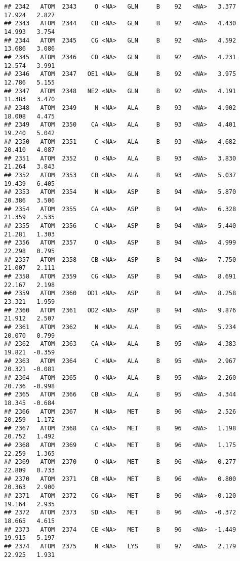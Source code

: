 \documentclass[
]{article}
\begin{document}
\begin{verbatim}
## 2342   ATOM  2343     O <NA>   GLN     B    92   <NA>   3.377  17.924   2.827
## 2343   ATOM  2344    CB <NA>   GLN     B    92   <NA>   4.430  14.993   3.754
## 2344   ATOM  2345    CG <NA>   GLN     B    92   <NA>   4.592  13.686   3.086
## 2345   ATOM  2346    CD <NA>   GLN     B    92   <NA>   4.231  12.574   3.991
## 2346   ATOM  2347   OE1 <NA>   GLN     B    92   <NA>   3.975  12.786   5.155
## 2347   ATOM  2348   NE2 <NA>   GLN     B    92   <NA>   4.191  11.383   3.470
## 2348   ATOM  2349     N <NA>   ALA     B    93   <NA>   4.902  18.008   4.475
## 2349   ATOM  2350    CA <NA>   ALA     B    93   <NA>   4.401  19.240   5.042
## 2350   ATOM  2351     C <NA>   ALA     B    93   <NA>   4.682  20.410   4.087
## 2351   ATOM  2352     O <NA>   ALA     B    93   <NA>   3.830  21.264   3.843
## 2352   ATOM  2353    CB <NA>   ALA     B    93   <NA>   5.037  19.439   6.405
## 2353   ATOM  2354     N <NA>   ASP     B    94   <NA>   5.870  20.386   3.506
## 2354   ATOM  2355    CA <NA>   ASP     B    94   <NA>   6.328  21.359   2.535
## 2355   ATOM  2356     C <NA>   ASP     B    94   <NA>   5.440  21.281   1.303
## 2356   ATOM  2357     O <NA>   ASP     B    94   <NA>   4.999  22.298   0.795
## 2357   ATOM  2358    CB <NA>   ASP     B    94   <NA>   7.750  21.007   2.111
## 2358   ATOM  2359    CG <NA>   ASP     B    94   <NA>   8.691  22.167   2.198
## 2359   ATOM  2360   OD1 <NA>   ASP     B    94   <NA>   8.258  23.321   1.959
## 2360   ATOM  2361   OD2 <NA>   ASP     B    94   <NA>   9.876  21.912   2.507
## 2361   ATOM  2362     N <NA>   ALA     B    95   <NA>   5.234  20.070   0.799
## 2362   ATOM  2363    CA <NA>   ALA     B    95   <NA>   4.383  19.821  -0.359
## 2363   ATOM  2364     C <NA>   ALA     B    95   <NA>   2.967  20.321  -0.081
## 2364   ATOM  2365     O <NA>   ALA     B    95   <NA>   2.260  20.736  -0.998
## 2365   ATOM  2366    CB <NA>   ALA     B    95   <NA>   4.344  18.345  -0.684
## 2366   ATOM  2367     N <NA>   MET     B    96   <NA>   2.526  20.259   1.172
## 2367   ATOM  2368    CA <NA>   MET     B    96   <NA>   1.198  20.752   1.492
## 2368   ATOM  2369     C <NA>   MET     B    96   <NA>   1.175  22.259   1.365
## 2369   ATOM  2370     O <NA>   MET     B    96   <NA>   0.277  22.809   0.733
## 2370   ATOM  2371    CB <NA>   MET     B    96   <NA>   0.800  20.363   2.900
## 2371   ATOM  2372    CG <NA>   MET     B    96   <NA>  -0.120  19.164   2.935
## 2372   ATOM  2373    SD <NA>   MET     B    96   <NA>  -0.372  18.665   4.615
## 2373   ATOM  2374    CE <NA>   MET     B    96   <NA>  -1.449  19.915   5.197
## 2374   ATOM  2375     N <NA>   LYS     B    97   <NA>   2.179  22.925   1.931

\end{verbatim}
\end{document}
